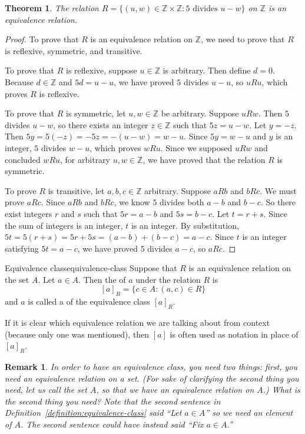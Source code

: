 \documentclass{book}
\newcounter{ekcounter}%
\theoremstyle{ekimcustom}
\newtheorem{theorem}[ekcounter]{Theorem}
\newtheorem{remark}[ekcounter]{Remark}
\newcommand\defn[1]{{\color{blue}{\bf #1}}}
\begin{document}
\begin{theorem}\label{theorem:residue5}
The relation $R = \{(u,w) \in \mathbb{Z} \times \mathbb{Z} : 5 \text{ divides } u-w\}$ on $\mathbb{Z}$ is an equivalence relation. 
\end{theorem}
\begin{proof}
To prove that $R$ is an equivalence relation on $\mathbb{Z}$, we need to prove that $R$ is reflexive, symmetric, and transitive.

To prove that $R$ is reflexive, suppose $u \in \mathbb{Z}$ is arbitrary. Then define $d=0$. Because $d \in \mathbb{Z}$ and $5d=u-u$, we have proved $5$ divides $u-u$, so $uRu$, which proves $R$ is reflexive.

To prove that $R$ is symmetric, let $u,w \in \mathbb{Z}$ be arbitrary. Suppose $uRw$. Then $5$ divides $u-w$, so there exists an integer $z \in \mathbb{Z}$ such that $5z=u-w$. Let $y=-z$. Then $5y=5(-z)=-5z=-(u-w)=w-u$. Since $5y=w-u$ and $y$ is an integer, $5$ divides $w-u$, which proves $wRu$. Since we supposed $uRw$ and concluded $wRu$, for arbitrary $u,w \in \mathbb{Z}$, we have proved that the relation $R$ is symmetric.

To prove $R$ is transitive, let $a,b,c \in \mathbb{Z}$ arbitrary. Suppose $aRb$ and $bRc$. We must prove $aRc$. Since $aRb$ and $bRc$, we know $5$ divides both $a-b$ and $b-c$. So there exist integers $r$ and $s$ such that $5r=a-b$ and $5s=b-c$. Let $t =r+s$. Since the sum of integers is an integer, $t$ is an integer. By substitution, $5t=5(r+s)=5r+5s=(a-b)+(b-c)=a-c$. Since $t$ is an integer satisfying $5t=a-c$, we have proved $5$ divides $a-c$, so $aRc$.
\end{proof}

\begin{bdefinition}{Equivalence class}{equivalence-class}
Suppose that $R$ is an equivalence relation on the set $A$. Let $a \in A$. Then the \defn{equivalence class} of $a$ under the relation $R$ is
\[ [a]_R = \{ c \in A : (a,c) \in R\}\]
and $a$ is called a \defn{representative} of the equivalence class $[a]_R$.
\end{bdefinition}
If it is clear which equivalence relation we are talking about from context (because only one was mentioned), then $[a]$ is often used as notation in place of $[a]_R$.
\begin{remark}\label{remark:needed-for-equivalence-class}
In order to have an equivalence class, you need two things: first, you need an equivalence relation on a set. (For sake of clarifying the second thing you need, let us call the set $A$, so that we have an equivalence relation on $A$.) What is the second thing you need? Note that the second sentence in Definition~\ref{definition:equivalence-class} said ``Let $a \in A$'' so we need an element of $A$. The second sentence could have instead said ``Fix $a \in A$.''
\end{remark}
\end{document}

